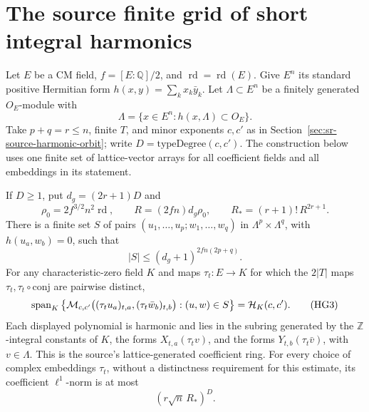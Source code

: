\section{The source finite grid of short integral harmonics}
\label{sec:sr-source-short-harmonic-grid}

Let \(E\) be a CM field, \(f=[E:\mathbb Q]/2\), and
\(\operatorname{rd}=\operatorname{rd}(E)\).
Give \(E^n\) its standard positive Hermitian form
\(h(x,y)=\sum_kx_k\bar y_k\).
Let \(\Lambda\subset E^n\) be a finitely generated
\(O_E\)-module with
\[
 \Lambda=\{x\in E^n:h(x,\Lambda)\subset O_E\}.
 \tag{HG1}\label{eq:sr-source-harmonic-selfdual}
\]
Take \(p+q=r\le n\), finite \(T\), and minor exponents
\(c,c'\) as in Section~\ref{sec:sr-source-harmonic-orbit};
write \(D=\mathrm{typeDegree}(c,c')\).
The construction below uses one finite set of lattice-vector
arrays for all coefficient fields and all embeddings in its
statement.

\begin{srproposition}\label{prop:sr-source-short-harmonic-grid}
If \(D\ge1\), put \(d_g=(2r+1)D\) and
\[
 \rho_0=2f^{3/2}n^2\operatorname{rd},\qquad
 R=(2fn)d_g\rho_0,\qquad
 R_*=(r+1)!\,R^{2r+1}.
\]
There is a finite set \(S\) of pairs
\((u_1,\ldots,u_p;w_1,\ldots,w_q)\) in
\(\Lambda^p\times\Lambda^q\), with \(h(u_a,w_b)=0\),
such that
\[
 |S|\le(d_g+1)^{2fn(2p+q)}.
 \tag{HG2}\label{eq:sr-source-harmonic-grid-card}
\]
For any characteristic-zero field \(K\) and maps
\(\tau_t:E\to K\) for which the \(2|T|\) maps
\(\tau_t,\tau_t\circ\mathrm{conj}\) are pairwise distinct,
\[
 \operatorname{span}_K
 \left\{{\cal M}_{c,c'}\bigl((\tau_tu_a)_{t,a},
                         (\tau_t\bar w_b)_{t,b}\bigr):
                         (u,w)\in S\right\}
            ={\cal H}_K(c,c').
 \tag{HG3}\label{eq:sr-source-harmonic-grid-span}
\]
Each displayed polynomial is harmonic and lies in the
subring generated by the \(\mathbb Z\)-integral constants
of \(K\), the forms \(X_{t,a}(\tau_t v)\), and the forms
\(Y_{t,b}(\tau_t\bar v)\), with \(v\in\Lambda\).
This is the source's lattice-generated coefficient ring.
For every choice of complex embeddings \(\tau_t\), without
a distinctness requirement for this estimate, its
coefficient \(\ell^1\)-norm is at most
\[
       (r\sqrt n\,R_*)^D.
 \tag{HG4}\label{eq:sr-source-harmonic-grid-l1}
\]
\end{srproposition}

